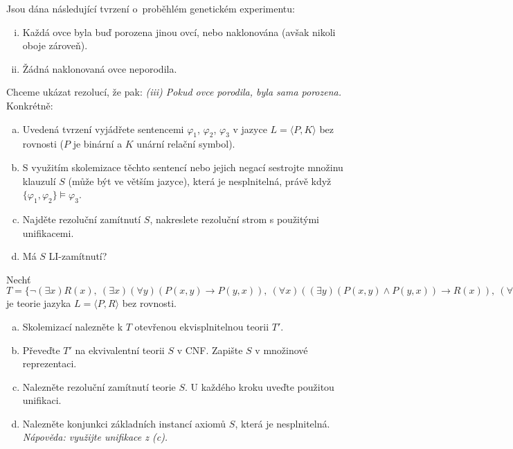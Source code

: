 \begin{problem}

    Jsou dána následující tvrzení o~proběhlém genetickém experimentu:
    \begin{enumerate}[(i)]\it
        \item Každá ovce byla buď porozena jinou ovcí, nebo naklonována (avšak nikoli oboje zároveň).
        \item Žádná naklonovaná ovce neporodila.
    \end{enumerate}
    Chceme ukázat rezolucí, že pak: {\it (iii) Pokud ovce porodila, byla sama porozena.} Konkrétně:
    \begin{enumerate}[(a)]
        \item Uvedená tvrzení vyjádřete sentencemi $\varphi_1$, $\varphi_2$, $\varphi_3$ v jazyce $L=\langle P,K\rangle$ bez rovnosti ($P$ je binární a $K$ unární relační symbol).
        \item S využitím skolemizace těchto sentencí nebo jejich negací sestrojte množinu klauzulí $S$ (může být ve větším jazyce), která je nesplnitelná, právě když  $\{\varphi_1, \varphi_2\} \models \varphi_3$. %
        \item Najděte rezoluční zamítnutí $S$, nakreslete rezoluční strom s použitými unifikacemi.
        \item Má $S$ LI-zamítnutí?
    \end{enumerate}

    \begin{solution}
                    
    \end{solution}

\end{problem}


\begin{problem}

    Nechť $T=\{\neg(\exists x) R(x),\ (\exists x)(\forall y)(P(x,y)\to P(y,x)),\ (\forall x)((\exists y)(P(x,y)\wedge P(y,x))\to R(x)),\ (\forall x)(\exists y)P(x,y)\}$ je teorie jazyka $L=\langle P,R\rangle$ bez rovnosti.

    \begin{enumerate}[(a)]
        \item Skolemizací nalezněte k $T$ otevřenou ekvisplnitelnou teorii $T'$.
        \item Převeďte $T'$ na ekvivalentní teorii $S$ v CNF. Zapište $S$ v množinové reprezentaci.
        \item Nalezněte rezoluční zamítnutí teorie $S$. U každého kroku uveďte použitou unifikaci.
        \item Nalezněte konjunkci základních instancí axiomů $S$, která je nesplnitelná. {\it Nápověda: využijte unifikace z (c).}       
    \end{enumerate}

    \begin{solution}
                    
    \end{solution}

\end{problem}

